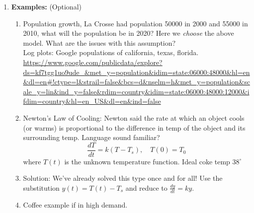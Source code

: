 \documentclass{article}
\begin{document}
\begin{enumerate}
\item {\bf Examples:} (Optional)
\begin{enumerate}
\item Population growth, La Crosse had population 50000 in 2000 and 55000 in 2010, what will the population be in 2020? Here we \emph{choose} the above model. What are the issues with this assumption? \\
Log plots: Google populations of california, texas, florida. \url{https://www.google.com/publicdata/explore?ds=kf7tgg1uo9ude_&met_y=population&idim=state:06000:48000&hl=en&dl=en#!ctype=l&strail=false&bcs=d&nselm=h&met_y=population&scale_y=lin&ind_y=false&rdim=country&idim=state:06000:48000:12000&ifdim=country&hl=en_US&dl=en&ind=false}
\item Newton's Law of Cooling: Newton said the rate at which an object cools (or warms) is proportional to the difference in temp of the object and its surrounding temp. Language sound familiar?
$$
\frac{dT}{dt} = k(T-T_s), \quad T(0)=T_0
$$
where $T(t)$ is the unknown temperature function. Ideal coke temp $38^{\circ}$
\item Solution: We've already solved this type once and for all! Use the substitution $y(t)=T(t)-T_s$ and reduce to $\frac{dy}{dt}=ky$.
\item Coffee example if in high demand.
\end{enumerate}
\end{enumerate}


\end{document}
